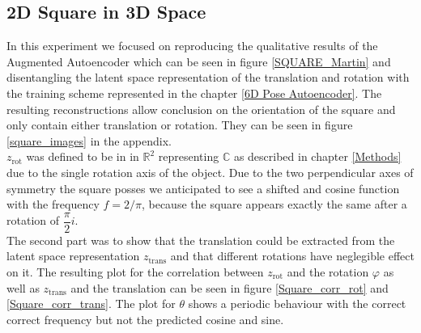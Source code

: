 \documentclass[10pt,a4paper]{article}
\newcommand{\rot}{\ensuremath{\text{rot}\xspace}}
\newcommand{\trans}{\ensuremath{\text{trans}\xspace}}
\begin{document}
\subsection{2D Square in 3D Space}\label{Square}
In this experiment we focused on reproducing the qualitative results of the Augmented Autoencoder which can be seen in figure \ref{SQUARE_Martin} and disentangling the latent space representation of the translation and rotation with the training scheme represented in the chapter \ref{6D Pose Autoencoder}. The resulting reconstructions allow conclusion on the orientation of the square and only contain either translation or rotation. They can be seen in figure \ref{square_images} in the appendix.\\
$z_{\rot}$ was defined to be in in $\mathbb{R}^2$ representing $\mathbb{C}$ as described in chapter \ref{Methods} due to the single rotation axis of the object. Due to the two perpendicular axes of symmetry the square posses we anticipated to see a shifted and cosine function with the frequency $f = 2/ \pi$, because the square appears exactly the same after a rotation of $\dfrac{\pi}{2}i$. \\
The second part was to show that the translation could be extracted from the latent space representation $z_{\trans}$ and that different rotations have neglegible effect on it. The resulting plot for the correlation between $z_{\rot}$ and the rotation $\varphi$ as well as $z_{\trans}$ and the translation can be seen in figure \ref{Square_corr_rot} and \ref{Square_corr_trans}. 
The plot for $\theta$ shows a periodic behaviour with the correct correct frequency but not the predicted cosine and sine.
\end{document}
